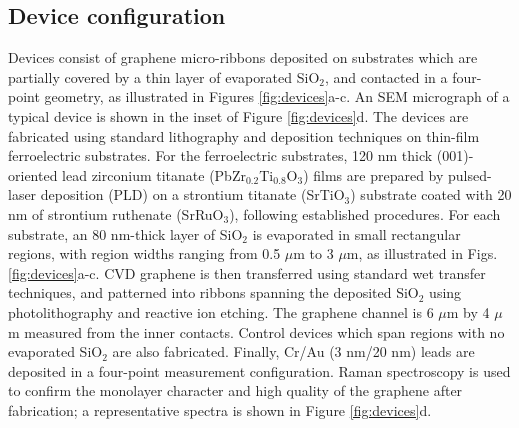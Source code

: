 \documentclass[edeposit,fullpage,draftthesis]{uiucthesis2009}
\begin{document}
    \subsection{Device configuration}
    
        Devices consist of graphene micro-ribbons deposited on substrates which are partially covered by a thin layer of evaporated SiO$_2$, and contacted in a four-point geometry, as illustrated in Figures \ref{fig:devices}a-c. An SEM micrograph of a typical device is shown in the inset of Figure \ref{fig:devices}d. The devices are fabricated using standard lithography and deposition techniques on thin-film ferroelectric substrates. For the ferroelectric substrates, 120 nm thick (001)-oriented lead zirconium titanate (PbZr$_{0.2}$Ti$_{0.8}$O$_3$) films are prepared by pulsed-laser deposition (PLD) on a strontium titanate (SrTiO$_3$) substrate coated with 20 nm of strontium ruthenate (SrRuO$_3$), following established procedures\cite{Xu2014,Karthik2012}. For each substrate, an 80 nm-thick layer of SiO$_2$ is evaporated in small rectangular regions, with region widths ranging from 0.5 $\mu$m to 3 $\mu$m, as illustrated in Figs. \ref{fig:devices}a-c. CVD graphene is then transferred using standard wet transfer techniques\cite{Li2009}, and patterned into ribbons spanning the deposited SiO$_2$ using photolithography and reactive ion etching. The graphene channel is 6 $\mu$m by 4 $\mu$m measured from the inner contacts. Control devices which span regions with no evaporated SiO$_2$ are also fabricated. Finally, Cr/Au (3 nm/20 nm) leads are deposited in a four-point measurement configuration.  Raman spectroscopy is used to confirm the monolayer character and high quality of the graphene after fabrication; a representative spectra is shown in Figure \ref{fig:devices}d.
\end{document}
